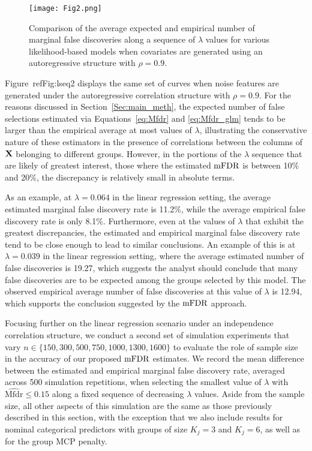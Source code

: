 \begin{figure} [!htb]
\centering
\texttt{[image: Fig2.png]}
\caption{\label{Fig:lseq2} Comparison of the average expected and empirical number of marginal false discoveries along a sequence of $\lambda$ values for various likelihood-based models when covariates are generated using an autoregressive structure with $\rho = 0.9$.}
\end{figure}

Figure~ref{Fig:lseq2} displays the same set of curves when noise features are generated under the autoregressive correlation structure with $\rho = 0.9$.  For the reasons discussed in Section~\ref{Sec:main_meth}, the expected number of false selections estimated via Equations~\ref{eq:Mfdr} and \ref{eq:Mfdr_glm} tends to be larger than the empirical average at most values of $\lambda$, illustrating the conservative nature of these estimators in the presence of correlations between the columns of $\mathbf{X}$ belonging to different groups. However, in the portions of the $\lambda$ sequence that are likely of greatest interest, those where the estimated $\textrm{mFDR}$ is between 10\% and 20\%, the discrepancy is relatively small in absolute terms. 

As an example, at $\lambda = 0.064$ in the linear regression setting, the average estimated marginal false discovery rate is 11.2\%, while the average empirical false discovery rate is only 8.1\%. Furthermore, even at the values of $\lambda$ that exhibit the greatest discrepancies, the estimated and empirical marginal false discovery rate tend to be close enough to lead to similar conclusions. An example of this is at $\lambda = 0.039$ in the linear regression setting, where the average estimated number of false discoveries is 19.27, which suggests the analyst should conclude that many false discoveries are to be expected among the groups selected by this model. The observed empirical average number of false discoveries at this value of $\lambda$ is 12.94, which supports the conclusion suggested by the $\textrm{mFDR}$ approach.

Focusing further on the linear regression scenario under an independence correlation structure, we conduct a second set of simulation experiments that vary $n \in \{150, 300, 500, 750, 1000, 1300, 1600\}$ to evaluate the role of sample size in the accuracy of our proposed $\textrm{mFDR}$ estimates.  We record the mean difference between the estimated and empirical marginal false discovery rate, averaged across 500 simulation repetitions, when selecting the smallest value of $\lambda$ with $\widehat{\text{Mfdr}} \leq 0.15$ along a fixed sequence of decreasing $\lambda$ values.  Aside from the sample size, all other aspects of this simulation are the same as those previously described in this section, with the exception that we also include results for nominal categorical predictors with groups of size $K_j = 3$ and $K_j = 6$, as well as for the group MCP penalty.

